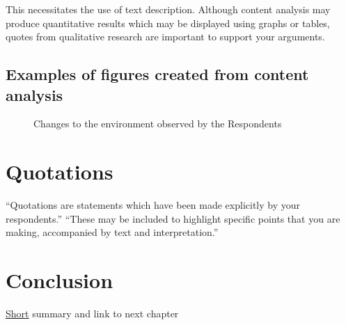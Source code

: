 This necessitates the use of text description. Although content analysis may produce quantitative results which may be displayed using graphs or tables, quotes from qualitative research are important to support your arguments. 

\subsection{Examples of figures created from content analysis}
 
 \begin{figure}[!htb]
        \caption{\label{fig:environment} Changes to the environment observed by the Respondents}
\end{figure}    


\section{Quotations}

``Quotations are statements which have been made explicitly by your respondents.''
``These may be included to highlight specific points that you are making, accompanied by text and interpretation.''

\section{Conclusion}
\label{sec:conclucionchapter4}
\underline{Short} summary and link to next chapter


